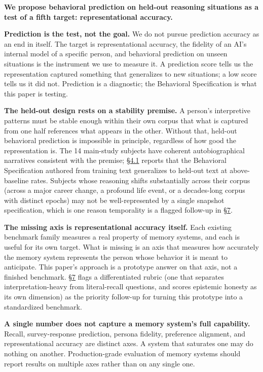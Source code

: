 \textbf{We propose behavioral prediction on held-out reasoning
situations as a test of a fifth target: representational accuracy.}

\textbf{Prediction is the test, not the goal.} We do not pursue
prediction accuracy as an end in itself. The target is representational
accuracy, the fidelity of an AI's internal model of a specific person,
and behavioral prediction on unseen situations is the instrument we use
to measure it. A prediction score tells us the representation captured
something that generalizes to new situations; a low score tells us it
did not. Prediction is a diagnostic; the Behavioral Specification is
what this paper is testing.

\textbf{The held-out design rests on a stability premise.} A person's
interpretive patterns must be stable enough within their own corpus that
what is captured from one half references what appears in the other.
Without that, held-out behavioral prediction is impossible in principle,
regardless of how good the representation is. The 14 main-study subjects
have coherent autobiographical narratives consistent with the premise;
\hyperref[the-cross-subject-gradient-and-its-per-question-mechanism]{§4.1} reports that the Behavioral Specification authored from training
text generalizes to held-out text at above-baseline rates. Subjects
whose reasoning shifts substantially across their corpus (across a major
career change, a profound life event, or a decades-long corpus with
distinct epochs) may not be well-represented by a single snapshot
specification, which is one reason temporality is a flagged follow-up in
\protect\hyperlink{future-work}{§7}.

\textbf{The missing axis is representational accuracy itself.} Each
existing benchmark family measures a real property of memory systems,
and each is useful for its own target. What is missing is an axis that
measures how accurately the memory system represents the person whose
behavior it is meant to anticipate. This paper's approach is a prototype
answer on that axis, not a finished benchmark.
\protect\hyperlink{future-work}{§7} flags a differentiated rubric (one
that separates interpretation-heavy from literal-recall questions, and
scores epistemic honesty as its own dimension) as the priority follow-up
for turning this prototype into a standardized benchmark.

\textbf{A single number does not capture a memory system's full
capability.} Recall, survey-response prediction, persona fidelity,
preference alignment, and representational accuracy are distinct axes. A
system that saturates one may do nothing on another. Production-grade
evaluation of memory systems should report results on multiple axes
rather than on any single one.

